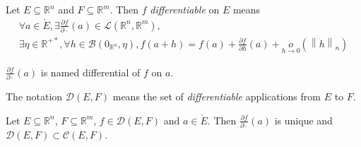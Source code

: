 \documentclass[11pt,en]{elegantpaper}
\newcommand{\norm}[1]{\left\lVert#1\right\rVert}
\newcommand{\Real}{\mathbb{R}}
\begin{document}
\begin{definition}
  Let $E \subseteq \Real^n$ and $F \subseteq \Real^m$.
  Then $f$ \textit{differentiable} on $E$ means \begin{equation}\label{def:differentiable}
    \begin{gathered}
      \forall a \in \mathring{E}, \exists \frac{\partial f}{\partial \cdot}(a) \in \mathcal{L}(\Real^n,\Real^m), \\
      \exists \eta \in \Real^{+*}, \forall h \in \mathcal{B}(0_{\Real^n},\eta),
        f(a+h) = f(a) + \frac{\partial f}{\partial h}(a) + \underset{h \to 0}o(\norm h _n)
    \end{gathered}
  \end{equation}

  $\frac{\partial f}{\partial \cdot}(a)$ is named differential of $f$ on $a$. \par
  The notation $\mathcal{D}(E,F)$ means the set of \textit{differentiable} applications from $E$ to $F$.
\end{definition}

\begin{proposition}\label{prop:differential_unique}
  {\normalfont Let $E \subseteq \Real^n$, $F \subseteq \Real^m$, $f \in \mathcal{D}(E,F)$ and $a \in \mathring{E}$.
  Then $\frac{\partial f}{\partial \cdot}(a)$ is unique and $\mathcal{D}(E,F) \subset \mathcal{C}(E,F)$.}
\end{proposition}
\end{document}

